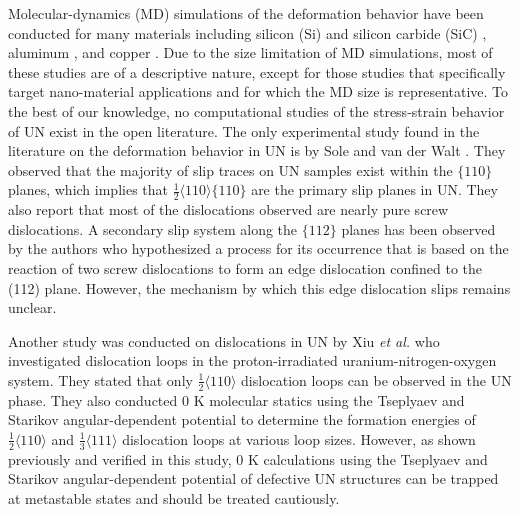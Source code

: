 \documentclass[applsci,article,submit,pdftex,moreauthors]{Definitions/mdpi}
\newcommand{\?}{\stackrel{?}{=}}
\begin{document}
Molecular-dynamics (MD) simulations of the deformation behavior have been conducted for many materials including silicon (Si) and silicon carbide (SiC) \cite{Ivashchenko2007}, aluminum \cite{Li2020}, and copper \cite{Hansson2022}. Due to the size limitation of MD simulations, most of these studies are of a descriptive nature, except for those studies that specifically target nano-material applications and for which the MD size is representative. To the best of our knowledge, no computational studies of the stress-strain behavior of UN exist in the open literature. The only experimental study found in the literature on the deformation behavior in UN is by Sole and van der Walt \cite{Sole1968}. They observed that the majority of slip traces on UN samples exist within the $\{110\}$ planes, which implies that $\frac{1}{2} \langle 110 \rangle \{110\}$ are the primary slip planes in UN. They also report that most of the dislocations observed are nearly pure screw dislocations. A secondary slip system along the $\{112\}$ planes has been observed by the authors who hypothesized a process for its occurrence that is based on the reaction of two screw dislocations to form an edge dislocation confined to the (112) plane. However, the mechanism by which this edge dislocation slips remains unclear.

Another study was conducted on dislocations in UN by Xiu \textit{et al.} \cite{Xiu2021} who investigated dislocation loops in the proton-irradiated uranium-nitrogen-oxygen system. They stated that only $\frac{1}{2} \langle 110 \rangle$ dislocation loops can be observed in the UN phase. They also conducted 0 K molecular statics using the Tseplyaev and Starikov angular-dependent potential \cite{Tseplyaev2016} to determine the formation energies of $\frac{1}{2} \langle 110 \rangle$ and $\frac{1}{3} \langle 111 \rangle$ dislocation loops at various loop sizes. However, as shown previously \cite{AbdulHameed2024} and verified in this study, 0 K calculations using the Tseplyaev and Starikov angular-dependent potential \cite{Tseplyaev2016} of defective UN structures can be trapped at metastable states and should be treated cautiously. 
\end{document}
